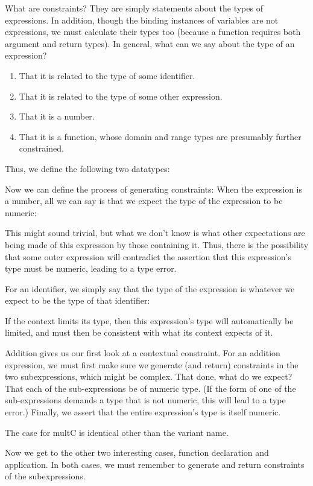 What are constraints? They are simply statements about the types of expressions.
In addition, though the binding instances of variables are not expressions, we must
calculate their types too (because a function requires both argument and return types).
In general, what can we say about the type of an expression?
\begin{enumerate}[nosep]
  \item 
That it is related to the type of some identifier.
  \item 
That it is related to the type of some other expression.
  \item 
That it is a number.
  \item 
That it is a function, whose domain and range types are presumably further
constrained.
\end{enumerate}
Thus, we define the following two datatypes:

Now we can define the process of generating constraints:
When the expression is a number, all we can say is that we expect the type of the
expression to be numeric:

This might sound trivial, but what we don’t know is what other expectations are
being made of this expression by those containing it. Thus, there is the possibility that
some outer expression will contradict the assertion that this expression’s type must be
numeric, leading to a type error.

For an identifier, we simply say that the type of the expression is whatever we
expect to be the type of that identifier:

If the context limits its type, then this expression’s type will automatically be limited,
and must then be consistent with what its context expects of it.

Addition gives us our first look at a contextual constraint. For an addition
expression, we must first make sure we generate (and return) constraints in the
two subexpressions, which might be complex. That done, what do we expect? That
each of the sub-expressions be of numeric type. (If the form of one of the
sub-expressions demands a type that is not numeric, this will lead to a type
error.) Finally, we assert that the entire expression’s type is itself numeric.

The case for multC is identical other than the variant name.

Now we get to the other two interesting cases, function declaration and application.
In both cases, we must remember to generate and return constraints of the subexpressions.

